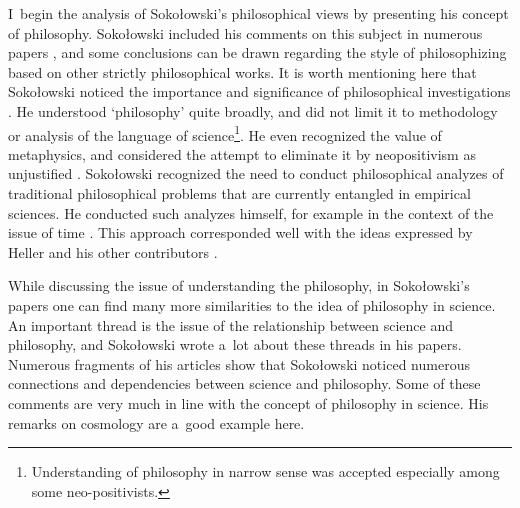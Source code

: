 I~begin the analysis of Sokołowski's philosophical views by presenting his concept of philosophy. Sokołowski included his comments on this subject in numerous papers 
\parencites[][]{}[][]{}[][]{}[][]{}[][]{}, %
 and some conclusions can be drawn regarding the style of philosophizing based on other strictly philosophical works. It is worth mentioning here that Sokołowski noticed the importance and significance of philosophical investigations 
\parencite[][p.63]{}. %
 He understood ‘philosophy' quite broadly, and did not limit it to methodology or analysis of the language of science\footnote{Understanding of philosophy in narrow sense was accepted especially among some neo-positivists.}. He even recognized the value of metaphysics, and considered the attempt to eliminate it by neopositivism as unjustified 
\parencite[][p.198]{}. %
 Sokołowski recognized the need to conduct philosophical analyzes of traditional philosophical problems that are currently entangled in empirical sciences. He conducted such analyzes himself, for example in the context of the issue of time 
\parencite[][]{}. %
 This approach corresponded well with the ideas expressed by Heller and his other contributors 
\parencites[][]{Heller1999Jak}[][]{Polak2019Philosophy}.%




While discussing the issue of understanding the philosophy, in Sokołowski's papers one can find many more similarities to the idea of philosophy in science. An important thread is the issue of the relationship between science and philosophy, and Sokołowski wrote a~lot about these threads in his papers. Numerous fragments of his articles show that Sokołowski noticed numerous connections and dependencies between science and philosophy. Some of these comments are very much in line with the concept of philosophy in science. His remarks on cosmology are a~good example here.



